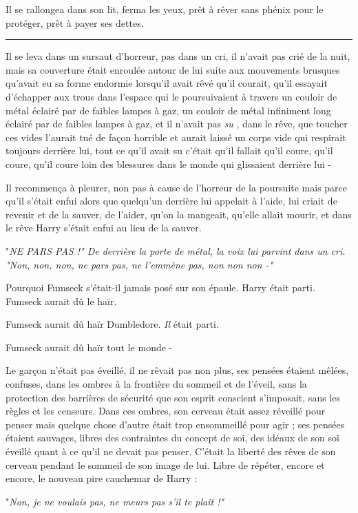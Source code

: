 Il se rallongea dans son lit, ferma les yeux, prêt à rêver sans phénix pour le protéger, prêt à payer ses dettes.
\par\noindent\rule{\textwidth}{0.4pt}
Il se leva dans un sursaut d'horreur, pas dans un cri, il n'avait pas crié de la nuit, mais sa couverture était enroulée autour de lui suite aux mouvements brusques qu'avait eu sa forme endormie lorsqu'il avait rêvé qu'il courait, qu'il essayait d'échapper aux trous dans l'espace qui le poursuivaient à travers un couloir de métal éclairé par de faibles lampes à gaz, un couloir de métal infiniment long éclairé par de faibles lampes à gaz, et il n'avait pas \emph{su} , dans le rêve, que toucher ces vides l'aurait tué de façon horrible et aurait laissé un corps vide qui respirait toujours derrière lui, tout ce qu'il avait su c'était qu'il fallait qu'il coure, qu'il coure, qu'il coure loin des blessures dans le monde qui glissaient derrière lui -

Il recommença à pleurer, non pas à cause de l'horreur de la poursuite mais parce qu'il s'était enfui alors que quelqu'un derrière lui appelait à l'aide, lui criait de revenir et de la sauver, de l'aider, qu'on la mangeait, qu'elle allait mourir, et dans le rêve Harry s'était enfui au lieu de la sauver.

"\emph{NE PARS PAS !" De derrière la porte de métal, la voix lui parvint dans un cri. "Non, non, non, ne pars pas, ne l'emmène pas, non non non -"} 

Pourquoi Fumseck s'était-il jamais posé sur son épaule. Harry était parti. Fumseck aurait dû le haïr.

Fumseck aurait dû haïr Dumbledore. \emph{Il } était parti.

Fumseck aurait dû haïr tout le monde -

Le garçon n'était pas éveillé, il ne rêvait pas non plus, ses pensées étaient mêlées, confuses, dans les ombres à la frontière du sommeil et de l'éveil, sans la protection des barrières de sécurité que son esprit conscient s'imposait, sans les règles et les censeurs. Dans ces ombres, son cerveau était assez réveillé pour penser mais quelque chose d'autre était trop ensommeillé pour agir ; ses pensées étaient sauvages, libres des contraintes du concept de soi, des idéaux de son soi éveillé quant à ce qu'il ne devait pas penser. C'était la liberté des rêves de son cerveau pendant le sommeil de son image de lui. Libre de répéter, encore et encore, le nouveau pire cauchemar de Harry :

"\emph{Non, je ne voulais pas, ne meurs pas s'il te plaît !"} 

